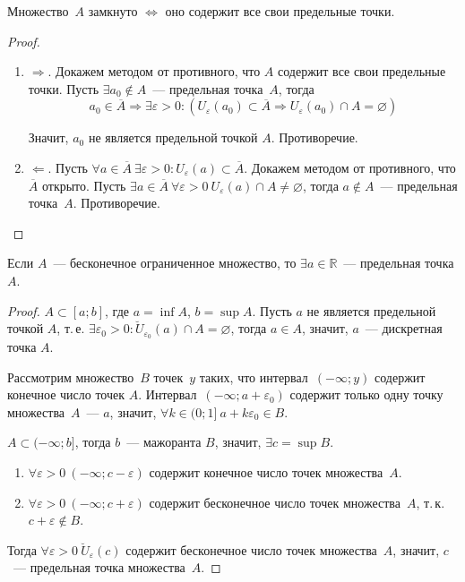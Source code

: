 \begin{statement}
Множество~$A$ замкнуто $\Leftrightarrow$ оно содержит все свои предельные точки.
\end{statement}
\begin{proof}
\begin{enumerate}
	\item $\Rightarrow$. Докажем методом от противного, что $A$ содержит все свои предельные точки.
	Пусть $\exists a_0 \notin A$~--- предельная точка~$A$, тогда
	\begin{equation*}
	a_0 \in \overline A \Rightarrow \exists \varepsilon > 0 \colon (U_\varepsilon(a_0) \subset \overline A \Rightarrow U_\varepsilon(a_0) \cap A = \varnothing)
	\end{equation*}
	
	Значит, $a_0$ не является предельной точкой $A$.
	Противоречие.
	
	\item $\Leftarrow$. Пусть $\forall a \in \overline A \ \exists \varepsilon > 0 \colon U_\varepsilon(a) \subset \overline A$.
	Докажем методом от противного, что $\overline A$ открыто.
	Пусть $\exists a \in \overline A \ \forall \varepsilon > 0 \ U_\varepsilon(a) \cap A \neq \varnothing$, тогда $a \notin A$~--- предельная точка~$A$.
	Противоречие.
\end{enumerate}
\end{proof}

\begin{theorem}[Вейерштрасса]
Если $A$~--- бесконечное ограниченное множество, то $\exists a \in \mathbb R$~--- предельная точка $A$.
\end{theorem}
\begin{proof}
$A \subset [a; b]$, где $a = \inf A$, $b = \sup A$.
Пусть $a$ не является предельной точкой $A$, т.\,е. $\exists \varepsilon_0 > 0 \colon \breve U_{\varepsilon_0}(a) \cap A = \varnothing$, тогда $a \in A$, значит, $a$~--- дискретная точка $A$.

Рассмотрим множество~$B$ точек~$y$ таких, что интервал~$(-\infty; y)$ содержит конечное число точек $A$.
Интервал~$(-\infty; a + \varepsilon_0)$ содержит только одну точку множества~$A$~--- $a$, значит, $\forall k \in (0; 1] \ a + k\varepsilon_0 \in B$.

$A \subset (-\infty; b]$, тогда $b$~--- мажоранта $B$, значит, $\exists c = \sup B$.
\begin{enumerate}
	\item $\forall \varepsilon > 0 \ (-\infty; c - \varepsilon)$ содержит конечное число точек множества~$A$.
	\item $\forall \varepsilon > 0 \ (-\infty; c + \varepsilon)$ содержит бесконечное число точек множества~$A$, т.\,к. $c + \varepsilon \notin B$.
\end{enumerate}

Тогда $\forall \varepsilon > 0 \ \breve U_\varepsilon(c)$ содержит бесконечное число точек множества~$A$, значит, $c$~--- предельная точка множества~$A$.
\end{proof}